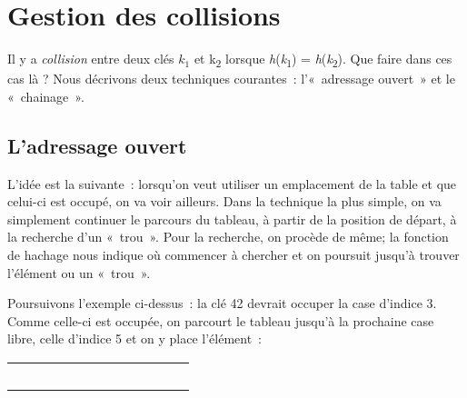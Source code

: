 \section{Gestion des collisions}
	
	Il y a \textit{collision} entre deux clés 
	$k_1$ et k\textsubscript{2} lorsque
	\textit{h}(\textit{k}\textsubscript{1}) 
	= \textit{h}(\textit{k}\textsubscript{2}). 
	Que faire dans ces cas là ? Nous
	décrivons deux techniques courantes~: 
	l'«~adressage ouvert~» et le «~chainage~».

	\subsection{L'adressage ouvert}
		
		L'idée est la suivante~: lorsqu'on veut utiliser un emplacement 
		de la table et que celui-ci est occupé, on va voir
		ailleurs. Dans la technique la plus simple, on va simplement 
		continuer le parcours du tableau, à partir de la position
		de départ, à la recherche d'un «~trou~». Pour la recherche, 
		on procède de même; la fonction de hachage nous indique où
		commencer à chercher et on poursuit jusqu'à trouver 
		l'élément ou un «~trou~».

		Poursuivons l'exemple ci-dessus~: la clé 42 devrait occuper 
		la case d'indice 3. Comme celle-ci est occupée, on parcourt
		le tableau jusqu'à la prochaine case libre, celle d'indice 5 
		et on y place l'élément~:

		\begin{center}
			\tablefirsthead{}
			\tablehead{}
			\tabletail{}
			\tablelasttail{}
			\begin{supertabular}{m{0.999cm}m{0.999cm}m{0.999cm}m{0.999cm}m{0.999cm}m{0.999cm}m{0.999cm}m{0.999cm}m{0.999cm}m{0.999cm}}
			 &
			 &
			 &
			 &
			 &
			 &
			 &
			 &
			 &
			\centering{}\\\hline
			 &
			 &
			 &
			 &
			 &
			 &
			 &
			 &
			 &
			\\\hline
			\end{supertabular}
		\end{center}
		
